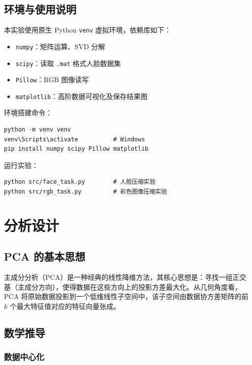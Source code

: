 \documentclass[a4paper]{article}
\begin{document}
\subsection{环境与使用说明}

本实验使用原生 Python \texttt{venv} 虚拟环境，依赖库如下：

\begin{itemize}
    \item \texttt{numpy}：矩阵运算、SVD 分解
    \item \texttt{scipy}：读取 \texttt{.mat} 格式人脸数据集
    \item \texttt{Pillow}：RGB 图像读写
    \item \texttt{matplotlib}：高阶数据可视化及保存结果图
\end{itemize}

环境搭建命令：

\begin{verbatim}
python -m venv venv
venv\Scripts\activate          # Windows
pip install numpy scipy Pillow matplotlib
\end{verbatim}

运行实验：

\begin{verbatim}
python src/face_task.py        # 人脸压缩实验
python src/rgb_task.py         # 彩色图像压缩实验
\end{verbatim}

\section{分析设计}

\subsection{PCA 的基本思想}

主成分分析（PCA）是一种经典的线性降维方法，其核心思想是：寻找一组正交基（主成分方向），使得数据在这些方向上的投影方差最大化。从几何角度看，PCA 将原始数据投影到一个低维线性子空间中，该子空间由数据协方差矩阵的前 $k$ 个最大特征值对应的特征向量张成。

\subsection{数学推导}

\subsubsection{数据中心化}
\end{document}
